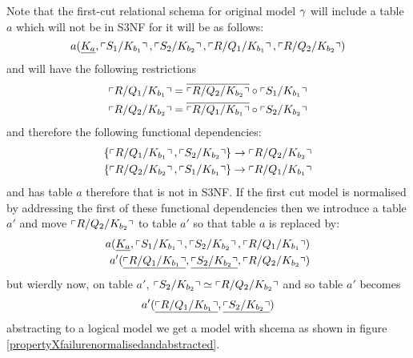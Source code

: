 Note that the first-cut relational schema for original model $\gamma$ will include a table $a$ which will not be in S3NF for it
will be as follows:
\begin{equation}
a(\underline{K_a},\left\ulcorner S_1/K_{b_1}\right\urcorner,\left\ulcorner S_2/K_{b_2}\right\urcorner, \left\ulcorner R/Q_1/K_{b_1}\right\urcorner, \left\ulcorner R/Q_2/K_{b_2}\right\urcorner)
\end{equation}
and will have the following restrictions
\begin{align}
\left\ulcorner R/Q_1/K_{b_1}\right\urcorner = \overline{\left\ulcorner R/Q_2/K_{b_2}\right\urcorner} \circ \left\ulcorner S_1/K_{b_1}\right\urcorner \\
\left\ulcorner R/Q_2/K_{b_2}\right\urcorner = \overline{\left\ulcorner R/Q_1/K_{b_1}\right\urcorner} \circ \left\ulcorner S_2/K_{b_2}\right\urcorner
\end{align}
and therefore the following functional dependencies:
\begin{align} 
\left\{\left\ulcorner R/Q_1/K_{b_1}\right\urcorner,\left\ulcorner S_2/K_{b_2}\right\urcorner\right\} \rightarrow \left\ulcorner R/Q_2/K_{b_2}\right\urcorner \\
\left\{\left\ulcorner R/Q_2/K_{b_2}\right\urcorner,\left\ulcorner S_1/K_{b_1}\right\urcorner\right\} \rightarrow \left\ulcorner R/Q_1/K_{b_1}\right\urcorner
\end{align}
and has table $a$ therefore that is not in S3NF.
If the first cut model is normalised by addressing the first of these functional dependencies then we 
introduce a table $a'$ and move $\left\ulcorner R/Q_2/K_{b_2}\right\urcorner$ to table $a'$ so that table $a$ is replaced by:
\begin{align}
a(\underline{K_a},\left\ulcorner S_1/K_{b_1}\right\urcorner,\left\ulcorner S_2/K_{b_2}\right\urcorner, \left\ulcorner R/Q_1/K_{b_1}\right\urcorner) \\
a'(\underline{\left\ulcorner R/Q_1/K_{b_1}\right\urcorner},\underline{\left\ulcorner S_2/K_{b_2}\right\urcorner}, \left\ulcorner R/Q_2/K_{b_2}\right\urcorner )
\end{align}
but wierdly now, on table $a'$,  $\left\ulcorner S_2/K_{b_2}\right\urcorner \simeq \left\ulcorner R/Q_2/K_{b_2}\right\urcorner$ and so table $a'$ becomes
\begin{align}
a'(\underline{\left\ulcorner R/Q_1/K_{b_1}\right\urcorner},\underline{\left\ulcorner S_2/K_{b_2}\right\urcorner} )
\end{align}
abstracting to a logical model we get a model with shcema as shown in figure \ref{propertyXfailurenormalisedandabstracted}.

